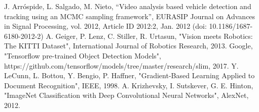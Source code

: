 \documentclass[conference]{IEEEtran}
\begin{document}
\begin{thebibliography}{00}
 J. Arróspide, L. Salgado, M. Nieto, “Video analysis based vehicle detection and tracking using an MCMC sampling framework”, EURASIP Journal on Advances in Signal Processing, vol. 2012, Article ID 2012:2, Jan. 2012 (doi: 10.1186/1687-6180-2012-2)
 A. Geiger, P. Lenz, C. Stiller, R. Urtasun, "Vision meets Robotics: The KITTI Dataset", International Journal of Robotics Research, 2013.
 Google, "Tensorflow pre-trained Object Detection Models", https://github.com/tensorflow/models/tree/master/research/slim, 2017.
 Y. LeCunn, L. Bottou, Y. Bengio, P. Haffner, "Gradient-Based Learning Applied to Document Recognition", IEEE, 1998.
 A. Krizhevsky, I. Sutskever, G. E. Hinton, "ImageNet Classification with Deep Convolutional Neural Networks", AlexNet, 2012. 
\end{thebibliography}
\end{document}
